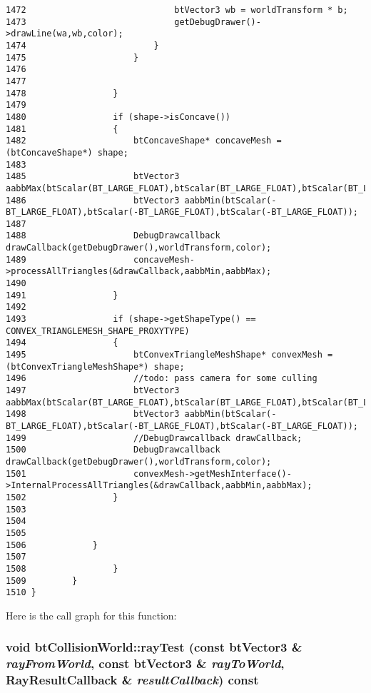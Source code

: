 \begin{Code}
\begin{verbatim}
1472                             btVector3 wb = worldTransform * b;
1473                             getDebugDrawer()->drawLine(wa,wb,color);
1474                         }
1475                     }
1476                     
1477                     
1478                 }
1479                     
1480                 if (shape->isConcave())
1481                 {
1482                     btConcaveShape* concaveMesh = (btConcaveShape*) shape;
1483 
1485                     btVector3 aabbMax(btScalar(BT_LARGE_FLOAT),btScalar(BT_LARGE_FLOAT),btScalar(BT_LARGE_FLOAT));
1486                     btVector3 aabbMin(btScalar(-BT_LARGE_FLOAT),btScalar(-BT_LARGE_FLOAT),btScalar(-BT_LARGE_FLOAT));
1487 
1488                     DebugDrawcallback drawCallback(getDebugDrawer(),worldTransform,color);
1489                     concaveMesh->processAllTriangles(&drawCallback,aabbMin,aabbMax);
1490 
1491                 }
1492 
1493                 if (shape->getShapeType() == CONVEX_TRIANGLEMESH_SHAPE_PROXYTYPE)
1494                 {
1495                     btConvexTriangleMeshShape* convexMesh = (btConvexTriangleMeshShape*) shape;
1496                     //todo: pass camera for some culling                        
1497                     btVector3 aabbMax(btScalar(BT_LARGE_FLOAT),btScalar(BT_LARGE_FLOAT),btScalar(BT_LARGE_FLOAT));
1498                     btVector3 aabbMin(btScalar(-BT_LARGE_FLOAT),btScalar(-BT_LARGE_FLOAT),btScalar(-BT_LARGE_FLOAT));
1499                     //DebugDrawcallback drawCallback;
1500                     DebugDrawcallback drawCallback(getDebugDrawer(),worldTransform,color);
1501                     convexMesh->getMeshInterface()->InternalProcessAllTriangles(&drawCallback,aabbMin,aabbMax);
1502                 }
1503 
1504 
1505                 
1506             }
1507        
1508                 }
1509         }
1510 }
\end{verbatim}
\end{Code}




Here is the call graph for this function:\hypertarget{classbt_collision_world_aac6675c8134f6695fecb431c72b0a6a}{
\subsubsection[rayTest]{\setlength{\rightskip}{0pt plus 5cm}void btCollisionWorld::rayTest (const btVector3 \& {\em rayFromWorld}, \/  const btVector3 \& {\em rayToWorld}, \/  {\bf RayResultCallback} \& {\em resultCallback}) const}}
\label{classbt_collision_world_aac6675c8134f6695fecb431c72b0a6a}


